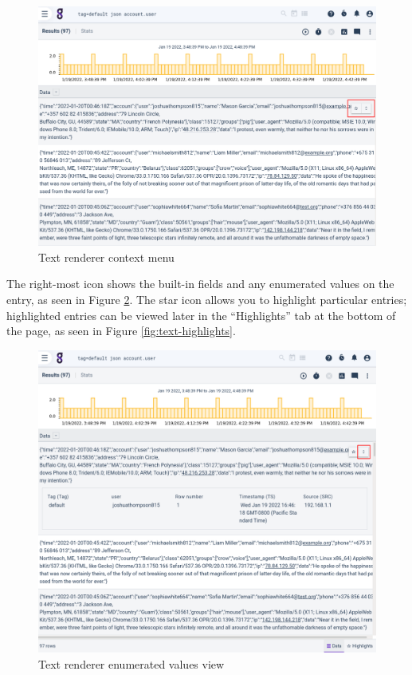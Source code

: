 \begin{figure}
	\includegraphics[width=0.7\linewidth]{images/text-context-menu.png}
	\caption{Text renderer context menu}
	\label{fig:text-context-menu}
\end{figure}

The right-most icon shows the built-in fields and any enumerated values on the entry, as seen in Figure \ref{fig:text-ev}. The star icon allows you to highlight particular entries; highlighted entries can be viewed later in the ``Highlights'' tab at the bottom of the page, as seen in Figure \ref{fig:text-highlights}.

\begin{figure}
	\includegraphics[width=0.7\linewidth]{images/text-ev.png}
	\caption{Text renderer enumerated values view}
	\label{fig:text-ev}
\end{figure}

